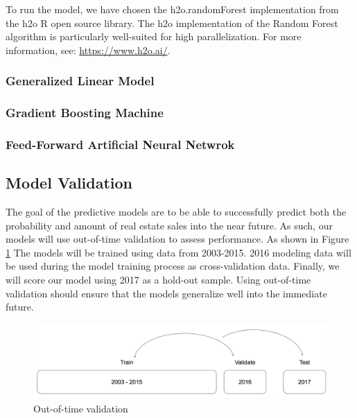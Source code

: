 \documentclass[12pt,]{article}
\begin{document}
To run the model, we have chosen the h2o.randomForest implementation
from the h2o R open source library. The h2o implementation of the Random
Forest algorithm is particularly well-suited for high parallelization.
For more information, see: \url{https://www.h2o.ai/}.

\hypertarget{generalized-linear-model}{%
\subsubsection{Generalized Linear
Model}\label{generalized-linear-model}}

\hypertarget{gradient-boosting-machine}{%
\subsubsection{Gradient Boosting
Machine}\label{gradient-boosting-machine}}

\hypertarget{feed-forward-artificial-neural-netwrok}{%
\subsubsection{Feed-Forward Artificial Neural
Netwrok}\label{feed-forward-artificial-neural-netwrok}}

\hypertarget{model-validation}{%
\subsection{Model Validation}\label{model-validation}}

The goal of the predictive models are to be able to successfully predict
both the probability and amount of real estate sales into the near
future. As such, our models will use out-of-time validation to assess
performance. As shown in Figure \ref{fig:Train Test Validate} The models
will be trained using data from 2003-2015. 2016 modeling data will be
used during the model training process as cross-validation data.
Finally, we will score our model using 2017 as a hold-out sample. Using
out-of-time validation should ensure that the models generalize well
into the immediate future.

\begin{figure}[H]
\includegraphics[width=1\linewidth]{Sections/tables and figures/Train Validate Test} \caption{Out-of-time validation}\label{fig:Train Test Validate}
\end{figure}
\end{document}
